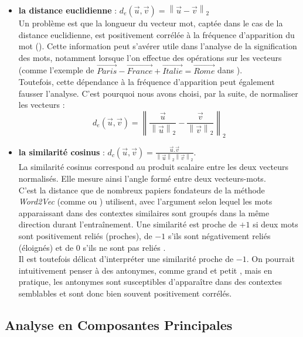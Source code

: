 \documentclass[11pt,french,french]{article}
\providecommand{\tightlist}{%
  \setlength{\parskip}{0pt}
  }
\begin{document}
\begin{itemize}
\tightlist
\item
  \textbf{la distance euclidienne} :
  \(d_{e}(\vec{u},\vec{v}) = \left\| \vec{u} - \vec{v} \right\|_2\)\\
  Un problème est que la longueur du vecteur mot, captée dans le cas de
  la distance euclidienne, est positivement corrélée à la fréquence
  d'apparition du mot (\cite{Schakel}). Cette information peut s'avérer
  utile dans l'analyse de la signification des mots, notamment lorsque
  l'on effectue des opérations sur les vecteurs (comme l'exemple de
  \(\overrightarrow{Paris} - \overrightarrow{France} + \overrightarrow{Italie} = \overrightarrow{Rome}\)
  dans \cite{Mikolov}).\\
  Toutefois, cette dépendance à la fréquence d'apparition peut également
  fausser l'analyse. C'est pourquoi nous avons choisi, par la suite, de
  normaliser les vecteurs :
  \[ d_{e}(\vec{u},\vec{v}) = \left\| \frac{\vec{u}}{\left\| \vec{u} \right\|_2} - \frac{\vec{v}}{\left\| \vec{v} \right\|_2}  \right\|_2\]
\item
  \textbf{la similarité cosinus} :
  \(d_{c}(\vec{u}, \vec{v}) = \frac{\vec{u}.\vec{v}}{\left\| \vec{u} \right\|_2 \left\| \vec{v} \right\|_2 }\).\\
  La similarité cosinus correspond au produit scalaire entre les deux
  vecteurs normalisés. Elle mesure ainsi l'angle formé entre deux
  vecteurs-mots.\\
  C'est la distance que de nombreux papiers fondateurs de la méthode
  \emph{Word2Vec} (comme \cite{Mikolov} ou \cite{Levy}) utilisent, avec
  l'argument selon lequel les mots apparaissant dans des contextes
  similaires sont groupés dans la même direction durant l'entraînement.
  Une similarité est proche de \(+1\) si deux mots sont positivement
  reliés (proches), de \(-1\) s'ils sont négativement reliés (éloignés)
  et de 0 s'ils ne sont pas \og reliés \fg{}.\\
  Il est toutefois délicat d'interpréter une similarité proche de
  \(-1\). On pourrait intuitivement penser à des antonymes, comme
  \og grand \fg{} et \og petit \fg{}, mais en pratique, les antonymes
  sont susceptibles d'apparaître dans des contextes semblables et sont
  donc bien souvent positivement corrélés.
\end{itemize}

\subsection{Analyse en Composantes
Principales}\label{analyse-en-composantes-principales}
\end{document}
